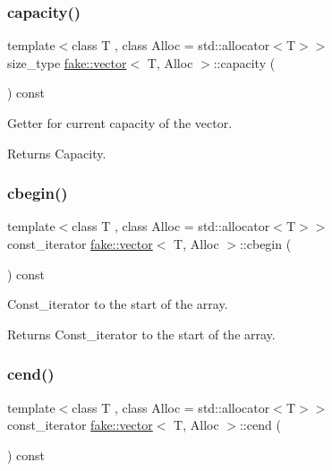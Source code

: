 \subsubsection{\texorpdfstring{capacity()}{capacity()}}
{\footnotesize\ttfamily template$<$class T , class Alloc  = std\+::allocator$<$\+T$>$$>$ \\
size\+\_\+type \mbox{\hyperlink{classfake_1_1vector}{fake\+::vector}}$<$ T, Alloc $>$\+::capacity (\begin{DoxyParamCaption}{ }\end{DoxyParamCaption}) const\hspace{0.3cm}{\ttfamily [inline]}}



Getter for current capacity of the vector. 

\begin{DoxyReturn}{Returns}
Capacity. 
\end{DoxyReturn}
\mbox{\label{classfake_1_1vector_a1fe60d8e10668ca0c3dab212e695ffc1}} 
\subsubsection{\texorpdfstring{cbegin()}{cbegin()}}
{\footnotesize\ttfamily template$<$class T , class Alloc  = std\+::allocator$<$\+T$>$$>$ \\
const\+\_\+iterator \mbox{\hyperlink{classfake_1_1vector}{fake\+::vector}}$<$ T, Alloc $>$\+::cbegin (\begin{DoxyParamCaption}{ }\end{DoxyParamCaption}) const\hspace{0.3cm}{\ttfamily [inline]}}



Const\+\_\+iterator to the start of the array. 

\begin{DoxyReturn}{Returns}
Const\+\_\+iterator to the start of the array. 
\end{DoxyReturn}
\mbox{\label{classfake_1_1vector_a764ef70912d85b94b0b130f33d8fd093}} 
\subsubsection{\texorpdfstring{cend()}{cend()}}
{\footnotesize\ttfamily template$<$class T , class Alloc  = std\+::allocator$<$\+T$>$$>$ \\
const\+\_\+iterator \mbox{\hyperlink{classfake_1_1vector}{fake\+::vector}}$<$ T, Alloc $>$\+::cend (\begin{DoxyParamCaption}{ }\end{DoxyParamCaption}) const\hspace{0.3cm}{\ttfamily [inline]}}



